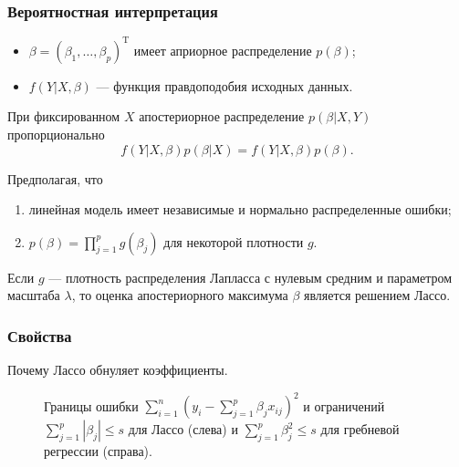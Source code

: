 \documentclass[unicode, notheorems]{beamer}
\newcommand{\T}{\mathrm{T}}
\begin{document}
\begin{frame}
\begin{frame}
 

\end{frame}

\begin{frame}
\frametitle{Вероятностная интерпретация}

\begin{itemize}
\item $\beta = (\beta_1, \ldots, \beta_p)^{\T}$ имеет априорное распределение $p(\beta)$;
\item $f(Y|X,\beta)$ --- функция правдоподобия исходных данных. 
\end{itemize}

\vspace{0.3cm}
При фиксированном $X$ апостериорное распределение $p(\beta|X,Y)$ пропорционально 
\[f(Y|X,\beta)p(\beta|X) = f(Y|X,\beta)p(\beta).\]

Предполагая, что 
\begin{enumerate}
\item линейная модель имеет независимые и нормально распределенные ошибки; 
\item $p(\beta) = \prod_{j = 1}^p g(\beta_j)$ для некоторой плотности $g$.
\end{enumerate}

\vspace{0.5cm}
Если $g$ --- плотность распределения Лапласса с нулевым средним и параметром масштаба $\lambda$, то оценка апостериорного максимума $\beta$ является решением Лассо. 


\end{frame}


\begin{frame}
\frametitle{Свойства}
Почему Лассо обнуляет коэффициенты.

\begin{figure}
\caption{Границы ошибки $\sum_{i=1}^n(y_i - \sum_{j=1}^p \beta_j x_{ij})^2$ и ограничений  $\sum_{j = 1}^p |\beta_j| \leq s$ для Лассо (слева) и $\sum_{j = 1}^p \beta_j^2 \leq s$ для гребневой регрессии (справа).}
\end{figure}


\end{frame}
\end{frame}
\end{document}
